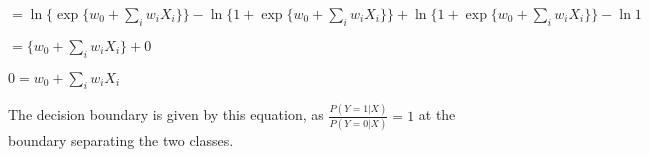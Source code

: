 \documentclass{exam}
\begin{document}
\begin{questions}
$= \ln{ \{\exp{\{w_{0} + \sum_{i} w_{i}X_{i}\}}\}} - \ln{\{ 1 + \exp{ \{ w_{0} + \sum_{i} w_{i}X_{i} \}} \}} + \ln{\{ 1 + \exp{ \{ w_{0} + \sum_{i} w_{i}X_{i} \}} \}} -\ln{1}$

$=\{{w_{0} + \sum_{i} w_{i}X_{i}}\} + 0$

$0 ={w_{0} + \sum_{i} w_{i}X_{i}} $

The decision boundary is given by this equation, as $\frac{P(Y=1 | X)}{P(Y=0 | X)} = 1$ at the boundary separating the two classes.








\end{questions}
\end{document}
